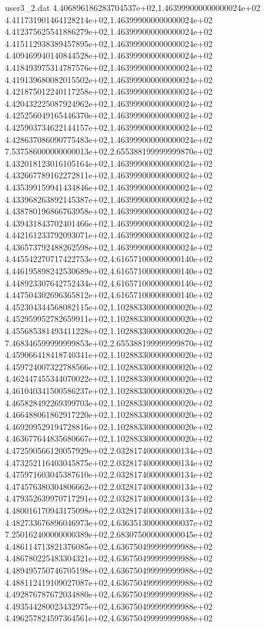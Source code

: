 \begin{filecontents}{user3_2.dat}
4.406896186283704537e+02,1.463999000000000024e+02
4.411731901464128214e+02,1.463999000000000024e+02
4.412375625541886279e+02,1.463999000000000024e+02
4.415112938389457895e+02,1.463999000000000024e+02
4.409469940140844528e+02,1.463999000000000024e+02
4.418493975314787576e+02,1.463999000000000024e+02
4.419139680082015502e+02,1.463999000000000024e+02
4.421875012240117258e+02,1.463999000000000024e+02
4.420432225087924962e+02,1.463999000000000024e+02
4.425256049165446370e+02,1.463999000000000024e+02
4.425903734622144157e+02,1.463999000000000024e+02
4.428637086090775483e+02,1.463999000000000024e+02
7.537586000000000013e+02,2.655388199999999870e+02
4.432018123016105164e+02,1.463999000000000024e+02
4.432667789162272811e+02,1.463999000000000024e+02
4.435399159941434846e+02,1.463999000000000024e+02
4.433968263892145387e+02,1.463999000000000024e+02
4.438780196866763958e+02,1.463999000000000024e+02
4.439431843702401466e+02,1.463999000000000024e+02
4.442161233792093071e+02,1.463999000000000024e+02
4.436573792488262598e+02,1.463999000000000024e+02
4.445542270717422753e+02,4.616571000000000140e+02
4.446195898242530689e+02,4.616571000000000140e+02
4.448923307642752434e+02,4.616571000000000140e+02
4.447504302696365812e+02,4.616571000000000140e+02
4.452304344568082115e+02,1.102883300000000020e+02
4.452959952782659911e+02,1.102883300000000020e+02
4.455685381493411228e+02,1.102883300000000020e+02
7.468346599999999853e+02,2.655388199999999870e+02
4.459066418418740341e+02,1.102883300000000020e+02
4.459724007322788566e+02,1.102883300000000020e+02
4.462447455344070022e+02,1.102883300000000020e+02
4.461040341500586237e+02,1.102883300000000020e+02
4.465828492269399703e+02,1.102883300000000020e+02
4.466488061862917220e+02,1.102883300000000020e+02
4.469209529194728816e+02,1.102883300000000020e+02
4.463677644835680667e+02,1.102883300000000020e+02
4.472590566120057929e+02,2.032817400000000134e+02
4.473252116403045875e+02,2.032817400000000134e+02
4.475971603045387610e+02,2.032817400000000134e+02
4.474576380304806662e+02,2.032817400000000134e+02
4.479352639970717291e+02,2.032817400000000134e+02
4.480016170943175098e+02,2.032817400000000134e+02
4.482733676896046973e+02,4.636351300000000037e+02
7.250162400000000389e+02,2.683075000000000045e+02
4.486114713821376085e+02,4.636750499999999988e+02
4.486780225483304321e+02,4.636750499999999988e+02
4.489495750746705198e+02,4.636750499999999988e+02
4.488112419109027087e+02,4.636750499999999988e+02
4.492876787672034880e+02,4.636750499999999988e+02
4.493544280023432975e+02,4.636750499999999988e+02
4.496257824597364561e+02,4.636750499999999988e+02

\end{filecontents}
